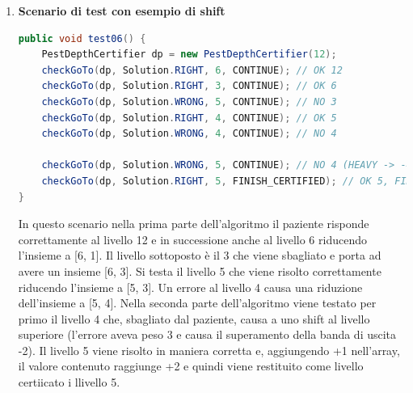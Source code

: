 \documentclass[
	corpo=12pt,
	twoside,
 	evenboxes,
	tipotesi=triennale,
    	stile=classica,
   	 greek,
]{toptesi}
\begin{document}
\begin{enumerate}
In questo scenario il paziente nella prima parte risponde correttamente al livello 12 e sbaglia consecutivamente i livelli 6, 9 e 11 restringendo l'insieme a [12, 11]. Nella seconda parte dell'algoritmo viene subito testato il livello 11 essendo il l'estremo destro; un errore su esso provoca un valore di -4 nell'array (-1 per averlo sbagliato nella prima parte e -3 per il secondo errore nella seconda parte con \textit{weight = 3}). Quindi si sottopone il livello 12 che era stato risolto correttamente nella prima parte (valore +1 nell'array). Due errori su questo livello provocano rispettivamente una sottrazione di -1 e un -3 (peso applicato) nell'array. Andando al di sotto del valore -2 nell'array anche per il livello 12 (il livello massimo nonchè quello iniziale), l'algoritmo restituisce una fine non certificata. 

\begin{lstlisting}[language=Java, label=lst:debug05, caption={Debug 05}]
[PART ONE] [0,0,0,0,0,0,0,0,0,0,0,1] [CURR:12 RIGHT NEXT:6 L:12 R:1]
[PART ONE] [0,0,0,0,0,-1,0,0,0,0,0,1] [CURR:6 WRONG NEXT:9 L:12 R:6]
[PART ONE] [0,0,0,0,0,-1,0,0,-1,0,0,1] [CURR:9 WRONG NEXT:11 L:12 R:9]
[PART ONE] [0,0,0,0,0,-1,0,0,-1,0,-1,1] [CURR:11 WRONG NEXT:11 L:12 R:11]
[PART TWO] [0,0,0,0,0,-1,0,0,-1,0,-4,1] [CURR:11 WRONG NEXT:12 L:12 R:11]
[PART TWO] [0,0,0,0,0,-1,0,0,-1,0,-4,0] [CURR:12 WRONG NEXT:12 L:12 R:11]
[PART TWO] [0,0,0,0,0,-1,0,0,-1,0,-4,-3] [CURR:12 WRONG NEXT:12 L:12 R:11]
\end{lstlisting}

\newpage

\item \textbf{Scenario di test con esempio di shift}

\begin{lstlisting}[language=Java, label=lst:test06, caption={Test 06}]
public void test06() {
	PestDepthCertifier dp = new PestDepthCertifier(12);
	checkGoTo(dp, Solution.RIGHT, 6, CONTINUE); // OK 12
	checkGoTo(dp, Solution.RIGHT, 3, CONTINUE); // OK 6
	checkGoTo(dp, Solution.WRONG, 5, CONTINUE); // NO 3
	checkGoTo(dp, Solution.RIGHT, 4, CONTINUE); // OK 5
	checkGoTo(dp, Solution.WRONG, 4, CONTINUE); // NO 4

	checkGoTo(dp, Solution.WRONG, 5, CONTINUE); // NO 4 (HEAVY -> -4), SHIFT TO 5
	checkGoTo(dp, Solution.RIGHT, 5, FINISH_CERTIFIED); // OK 5, FINISH_CERTIFIED
}
\end{lstlisting}

In questo scenario nella prima parte dell'algoritmo il paziente risponde correttamente al livello 12 e in successione anche al livello 6 riducendo l'insieme a [6, 1]. Il livello sottoposto è il 3 che viene sbagliato e porta ad avere un insieme [6, 3]. Si testa il livello 5 che viene risolto correttamente riducendo l'insieme a [5, 3]. Un errore al livello 4 causa una riduzione dell'insieme a [5, 4]. Nella seconda parte dell'algoritmo viene testato per primo il livello 4 che, sbagliato dal paziente, causa a uno shift al livello superiore (l'errore aveva peso 3 e causa il superamento della banda di uscita -2). Il livello 5 viene risolto in maniera corretta e, aggiungendo +1 nell'array, il valore contenuto raggiunge +2 e quindi viene restituito come livello certiicato i llivello 5.


\end{enumerate}
\end{document}
